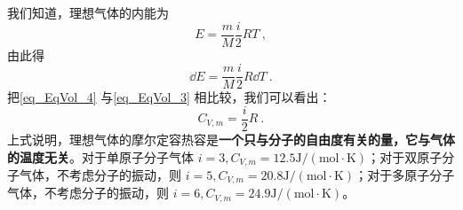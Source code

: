 我们知道，理想气体的内能为
\begin{equation}
E=\frac{m}{M} \frac{i}{2} R T~,
\end{equation}
由此得
\begin{equation} \label{eq_EqVol_4}
\dd E=\frac{m}{M} \frac{i}{2} R \dd T~.
\end{equation}
把\autoref{eq_EqVol_4} 与\autoref{eq_EqVol_3} 相比较，我们可以看出：
\begin{equation}
C_{V, m}=\frac{i}{2} R~.
\end{equation}
上式说明，理想气体的摩尔定容热容是\textbf{一个只与分子的自由度有关的量，它与气体的温度无关}。对于单原子分子气体 $i=3, C_{V, m}=12.5 \mathrm{J} /(\mathrm{mol} \cdot \mathrm{K})$；对于双原子分子气体，不考虑分子的振动，则 $i=5, C_{V, {m}}=20.8 \mathrm{J} /(\mathrm{mol} \cdot \mathrm{K})$；对于多原子分子气体，不考虑分子的振动，则 $i=6, C_{V, {m}}=24.9 \mathrm{J} /(\mathrm{mol} \cdot \mathrm{K})$。
